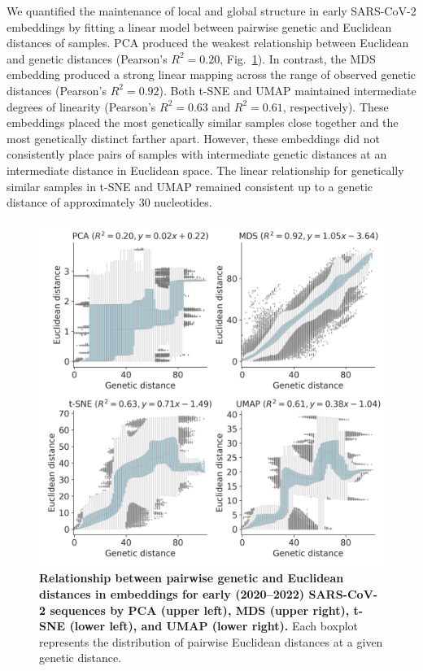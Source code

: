 \documentclass[10pt,letterpaper]{article}
\begin{document}
We quantified the maintenance of local and global structure in early SARS-CoV-2 embeddings by fitting a linear model between pairwise genetic and Euclidean distances of samples.
PCA produced the weakest relationship between Euclidean and genetic distances (Pearson's $R^{2}=0.20$, Fig.~\ref{fig:sars-cov-2-pairwise-distances}).
In contrast, the MDS embedding produced a strong linear mapping across the range of observed genetic distances (Pearson's $R^{2}=0.92$).
Both t-SNE and UMAP maintained intermediate degrees of linearity (Pearson's $R^{2}=0.63$ and $R^{2}=0.61$, respectively).
These embeddings placed the most genetically similar samples close together and the most genetically distinct farther apart.
However, these embeddings did not consistently place pairs of samples with intermediate genetic distances at an intermediate distance in Euclidean space.
The linear relationship for genetically similar samples in t-SNE and UMAP remained consistent up to a genetic distance of approximately 30 nucleotides.

\begin{figure}[!h]
\includegraphics[width=\columnwidth]{figures/sarscov2-euclidean-distance-by-genetic-distance.png}
\caption{{\bf Relationship between pairwise genetic and Euclidean distances in embeddings for early (2020--2022) SARS-CoV-2 sequences by PCA (upper left), MDS (upper right), t-SNE (lower left), and UMAP (lower right).}
  Each boxplot represents the distribution of pairwise Euclidean distances at a given genetic distance.
}
\label{fig:sars-cov-2-pairwise-distances}
\end{figure}
\end{document}
